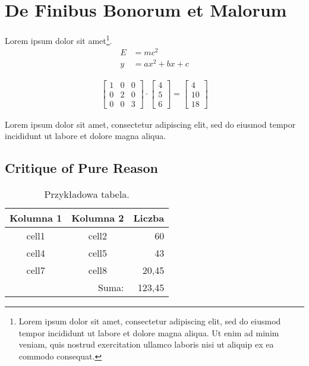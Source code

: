 \newpage %
\section{De Finibus Bonorum et Malorum}
\lipsum[1] Lorem ipsum dolor sit amet\footnote{Lorem ipsum dolor sit amet, consectetur adipiscing elit, sed do eiusmod tempor incididunt ut labore et dolore magna aliqua. Ut enim ad minim veniam, quis nostrud exercitation ullamco laboris nisi ut aliquip ex ea commodo consequat.}.
\begin{align*}
    E & = mc^2 \\
    y & = ax^2 + bx + c
\end{align*}

\lipsum[3]

\begin{align}
\begin{bmatrix}
    1 & 0 & 0 \\
    0 & 2 & 0 \\
    0 & 0 & 3
\end{bmatrix} \cdot
\begin{bmatrix}
    4 \\ 5 \\ 6
\end{bmatrix} =
\begin{bmatrix}
    4 \\ 10 \\ 18
\end{bmatrix}
\end{align}

\lipsum[4] Lorem ipsum dolor sit amet, consectetur adipiscing elit, sed do eiusmod tempor incididunt ut labore et dolore magna aliqua.

\subsection{Critique of Pure Reason}
\kant[1]

\begin{table}[!h] \centering
\caption{Przykładowa tabela.}
\label{tab:tabela1}

\begin{tabular} {| c | c | r |} \hline
    Kolumna 1 & Kolumna 2 & Liczba \\ \hline\hline
    cell1 & cell2 & 60 \\ \hline
    cell4 & cell5 & 43 \\ \hline
    cell7 & cell8 & 20,45 \\ \hline
    \multicolumn{2}{|r|}{Suma:} & 123,45 \\ \hline
\end{tabular}

\end{table}

